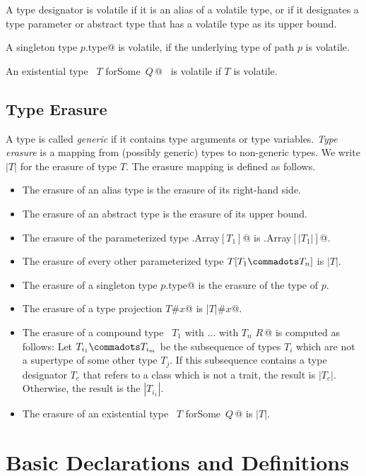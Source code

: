 A type designator is volatile if it is an alias of a volatile type, or
if it designates a type parameter or abstract type that has a volatile type as its
upper bound.

A singleton type \lstinline@$p$.type@ is volatile, if the underlying
type of path $p$ is volatile.

An existential type ~\lstinline@$T$ forSome {$\,Q\,$}@~ is volatile if
$T$ is volatile.

\section{Type Erasure}
\label{sec:erasure}

A type is called {\em generic} if it contains type arguments or type variables.
{\em Type erasure} is a mapping from (possibly generic) types to
non-generic types. We write $|T|$ for the erasure of type $T$.
The erasure mapping is defined as follows.
\begin{itemize}
\item The erasure of an alias type is the erasure of its right-hand side. %
\item The erasure of an abstract type is the erasure of its upper bound.
\item The erasure of the parameterized type \lstinline@scala.Array$[T_1]$@ is
 \lstinline@scala.Array$[|T_1|]$@.
 \item The erasure of every other parameterized type $T[T_1 \commadots T_n]$ is $|T|$.
\item The erasure of a singleton type \lstinline@$p$.type@ is the 
      erasure of the type of $p$.
\item The erasure of a type projection \lstinline@$T$#$x$@ is \lstinline@|$T$|#$x$@.
\item The erasure of a compound type ~\lstinline@$T_1$ with $\ldots$ with $T_n$ {$R\,$}@ 
      is computed as follows: Let $T_{i_1} \commadots T_{i_m}$ be the subsequence of types $T_i$  
      which are not a supertype of some other type $T_j$. 
      If this subsequence contains a type designator $T_c$ that refers to a class which is not a trait, 
      the result is $|T_c|$. Otherwise, the result is the $|T_{i_1}|$.
\item The erasure of an existential type ~\lstinline@$T$ forSome {$\,Q\,$}@ 
      is $|T|$.
\end{itemize}

\chapter{Basic Declarations and Definitions}
\label{sec:defs}

